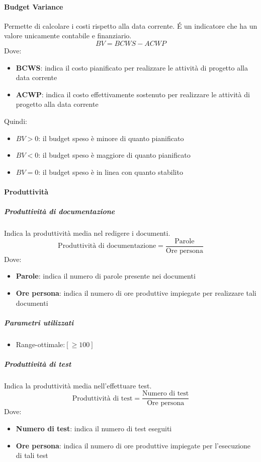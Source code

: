 \paragraph{Budget Variance}
Permette di calcolare i costi rispetto alla data corrente. \'E un indicatore che ha un valore
unicamente contabile e finanziario.
$$
BV = BCWS − ACWP
$$
Dove:
\begin{itemize}
\item \textbf{BCWS}: indica il costo pianificato per realizzare le attività di progetto alla data corrente
\item \textbf{ACWP}: indica il costo effettivamente sostenuto per realizzare le attività di progetto alla
  data corrente
\end{itemize}
Quindi:
\begin{itemize}
\item $BV>0$: il budget speso è minore di quanto pianificato
\item $BV<0$: il budget speso è maggiore di quanto pianificato
\item $BV=0$: il budget speso è in linea con quanto stabilito
\end{itemize}

\paragraph{Produttività}

\subparagraph{Produttività di documentazione}
Indica la produttività media nel redigere i documenti.
$$
\text{Produttività di documentazione} = \frac{\text{Parole}}{\text{Ore persona}}
$$
Dove:
\begin{itemize}
\item \textbf{Parole}: indica il numero di parole presente nei documenti
\item \textbf{Ore persona}: indica il numero di ore produttive impiegate per
  realizzare tali documenti
\end{itemize}

\subparagraph{Parametri utilizzati}
\begin{itemize}
\item Range-ottimale:$ [≥100]$
\end{itemize}

\subparagraph{Produttività di test}
Indica la produttività media nell'effettuare test.
$$
\text{Produttività di test} = \frac{\text{Numero di test}}{\text{Ore persona}}
$$
Dove:
\begin{itemize}
\item \textbf{Numero di test}: indica il numero di test eseguiti
\item  \textbf{Ore persona}: indica il numero di ore produttive
  impiegate per l'esecuzione di tali test
\end{itemize}

